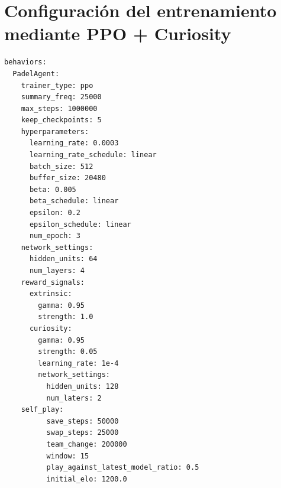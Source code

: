 \newpage
\section{Configuración del entrenamiento mediante PPO + Curiosity} \label{appendix:config-file-curiosity}
\begin{verbatim}
behaviors:
  PadelAgent:
    trainer_type: ppo
    summary_freq: 25000
    max_steps: 1000000
    keep_checkpoints: 5
    hyperparameters:
      learning_rate: 0.0003
      learning_rate_schedule: linear
      batch_size: 512
      buffer_size: 20480
      beta: 0.005
      beta_schedule: linear
      epsilon: 0.2
      epsilon_schedule: linear
      num_epoch: 3
    network_settings:
      hidden_units: 64
      num_layers: 4
    reward_signals:
      extrinsic:
        gamma: 0.95
        strength: 1.0
      curiosity:
        gamma: 0.95
        strength: 0.05
        learning_rate: 1e-4
        network_settings:
          hidden_units: 128
          num_laters: 2
    self_play:
          save_steps: 50000
          swap_steps: 25000
          team_change: 200000
          window: 15
          play_against_latest_model_ratio: 0.5
          initial_elo: 1200.0
\end{verbatim}
